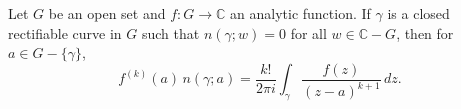 Let $G$ be an open set and $f: G \to \mathbb{C}$ an analytic function. If $\gamma$ is a closed rectifiable curve in $G$ such that $n(\gamma; w) = 0$ for all $w \in \mathbb{C} - G$, then for $a \in G - \{\gamma\}$,
$$
f^{(k)}(a) \, n(\gamma; a) = \frac{k!}{2\pi i} \int_{\gamma} \frac{f(z)}{(z - a)^{k+1}} \, dz.
$$
